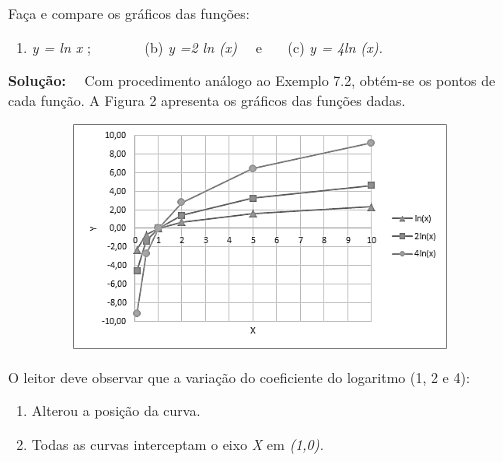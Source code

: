 \begin{texemplo}
    Faça e compare os gráficos das funções: 

    \begin{enumerate}
	    \item  \textit{y = ln x} ;~~~~~~ \quad ~(b)  \textit{y =2 ln (x)}~~ \quad e~~~ \quad (c) \textit{y = 4ln (x).}~~~~ 
    \end{enumerate}

    \textbf{Solução:}~~ Com procedimento análogo ao Exemplo 7.2, obtém-se os pontos de cada função. A Figura 2 apresenta os gráficos das funções dadas.

    \begin{figure}[H]
	    \begin{Center}
		    \includegraphics[width=4.62in,height=2.34in]{capitulos/logaritmos_e_funcao_logaritmica/media/image7.png}
    	\end{Center}
    \end{figure}

O leitor deve observar que a variação do coeficiente do logaritmo (1, 2 e 4):

\begin{enumerate}
	\item Alterou a posição da curva. 

	\item Todas as curvas interceptam o eixo \textit{X} em \textit{(1,0).} 
\end{enumerate}

\end{texemplo}

